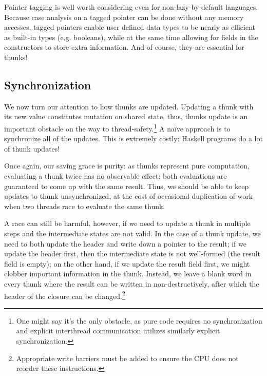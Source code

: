 Pointer tagging is well worth considering even for non-lazy-by-default
languages.  Because case analysis on a tagged pointer can be done
without any memory accesses, tagged pointers enable user defined data
types to be nearly as efficient as built-in types (e.g. booleans), while
at the same time allowing for fields in the constructors to store extra
information.  And of course, they are essential for thunks!

\subsection{Synchronization} \label{sec:sync}


We now turn our attention to how thunks are updated.  Updating a thunk
with its new value constitutes mutation on shared state, thus, thunks
update is an important obstacle on the way to
thread-safety.\footnote{One might say it's the only obstacle, as pure
code requires no synchronization and explicit interthread communication
utilizes similarly explicit synchronization.}  A na\"ive approach is to
synchronize all of the updates.  This is extremely costly: Haskell
programs do a lot of thunk updates!

Once again, our saving grace is purity: as thunks represent pure
computation, evaluating a thunk twice has no observable effect: both
evaluations are guaranteed to come up with the same result.  Thus, we
should be able to keep updates to thunk unsynchronized, at the cost of
occasional duplication of work when two threads race to evaluate the
same thunk.

A race can still be harmful, however, if we need to update a thunk in
multiple steps and the intermediate states are not valid.  In the case
of a thunk update, we need to both update the header and write down a
pointer to the result; if we update the header first, then the
intermediate state is not well-formed (the result field is empty); on
the other hand, if we update the result field first, we might clobber
important information in the thunk.  Instead, we leave a blank word in
every thunk where the result can be written in non-destructively, after
which the header of the closure can be changed.\footnote{Appropriate
write barriers must be added to ensure the CPU does not reorder these
instructions.}

